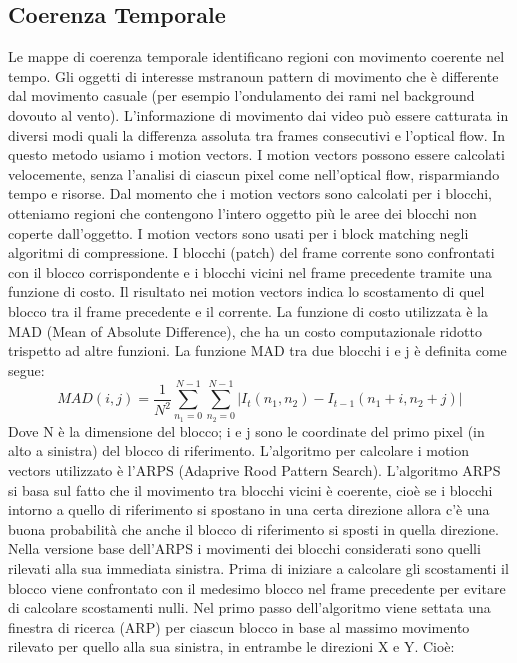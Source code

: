 \documentclass[12pt,oneside]{IEEEtran}
\begin{document}
		\subsection{Coerenza Temporale}
			Le mappe di coerenza temporale identificano regioni con movimento coerente nel tempo. Gli oggetti di interesse mstranoun pattern di movimento che è differente dal movimento casuale (per esempio l'ondulamento dei rami nel background dovouto al vento). L'informazione di movimento dai video può essere catturata in diversi modi quali la differenza assoluta tra frames consecutivi e l'optical flow. In questo metodo usiamo i motion vectors. I motion vectors possono essere calcolati velocemente, senza l'analisi di ciascun pixel come nell'optical flow, risparmiando tempo e risorse. Dal momento che i motion vectors sono calcolati per i blocchi, otteniamo regioni che contengono l'intero oggetto più le aree dei blocchi non coperte dall'oggetto.\newline
			I motion vectors sono usati per i block matching negli algoritmi di compressione. I blocchi (patch) del frame corrente sono confrontati con il blocco corrispondente e i blocchi vicini nel frame precedente tramite una funzione di costo. Il risultato nei motion vectors indica lo scostamento di quel blocco tra il frame precedente e il corrente. La funzione di costo utilizzata è la MAD (Mean of Absolute Difference), che ha un costo computazionale ridotto trispetto ad altre funzioni. La funzione MAD tra due blocchi i e j è definita come segue:
			\begin{equation}
			MAD(i,j) = \frac{1}{N^{2}}\sum_{n_{1}=0}^{N-1}\sum_{n_{2}=0}^{N-1} |I_{t}(n_{1},n_{2})-I_{t-1}(n_{1}+i,n_{2}+j)|
			\end{equation}
			Dove N è la dimensione del blocco; i e j sono le coordinate del primo pixel (in alto a sinistra) del blocco di riferimento. L'algoritmo per calcolare i motion vectors utilizzato è l'ARPS (Adaprive Rood Pattern Search). L'algoritmo ARPS si basa sul fatto che il movimento tra blocchi vicini è coerente, cioè se i blocchi intorno a quello di riferimento si spostano in una certa direzione allora c'è una buona probabilità che anche il blocco di riferimento si sposti in quella direzione. Nella versione base dell'ARPS i movimenti dei blocchi considerati sono quelli rilevati alla sua immediata sinistra.\newline
			Prima di iniziare a calcolare gli scostamenti il blocco viene confrontato con il medesimo blocco nel frame precedente per evitare di calcolare scostamenti nulli. 
			Nel primo passo dell'algoritmo viene settata una finestra di ricerca (ARP) per ciascun blocco in base al massimo movimento rilevato per quello alla sua sinistra, in entrambe le direzioni X e Y. Cioè:
\end{document}
